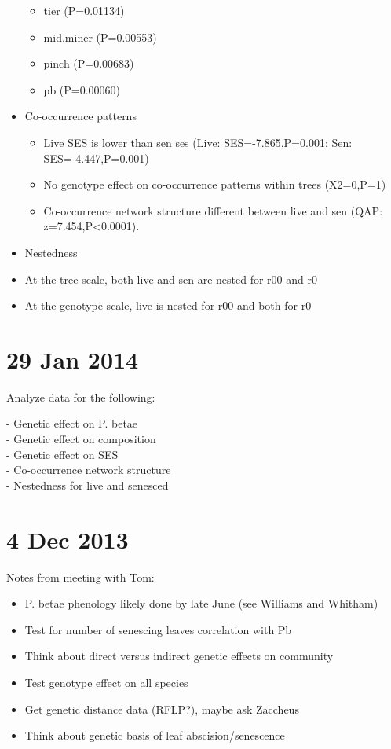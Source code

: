 \documentclass[12pt]{article}
\begin{document}
\begin{itemize}
\begin{itemize}
  \item tier (P=0.01134)
  \item mid.miner (P=0.00553)
  \item pinch (P=0.00683)
  \item pb (P=0.00060)
  \end{itemize}
\item Co-occurrence patterns
  \begin{itemize}
  \item Live SES is lower than sen ses (Live: SES=-7.865,P=0.001; Sen: SES=-4.447,P=0.001)
  \item No genotype effect on co-occurrence patterns within trees (X2=0,P=1)
  \item Co-occurrence network structure different between live and sen
    (QAP: z=7.454,P<0.0001).
  \end{itemize}
\item Nestedness
  \item At the tree scale, both live and sen are nested for r00 and r0
  \item At the genotype scale, live is nested for r00 and both for r0
\end{itemize}

\section{29 Jan 2014}

Analyze data for the following:

- Genetic effect on P. betae \\
- Genetic effect on composition \\
- Genetic effect on SES \\
- Co-occurrence network structure \\
- Nestedness for live and senesced \\


\section{4 Dec 2013}
Notes from meeting with Tom:

\begin{itemize}
\item P. betae phenology likely done by late June (see Williams and Whitham)
\item Test for number of senescing leaves correlation with Pb
\item Think about direct versus indirect genetic effects on community
\item Test genotype effect on all species
\item Get genetic distance data (RFLP?), maybe ask Zaccheus
\item Think about genetic basis of leaf abscision/senescence
\end{itemize}
\end{document}
